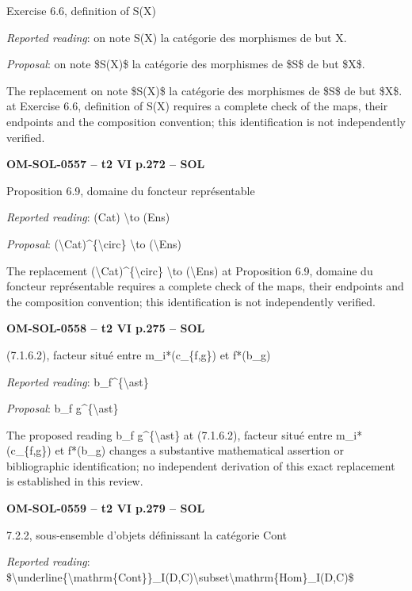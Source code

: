 Exercise 6.6, definition of S(X)\par
\emph{Reported reading}: on note S(X) la catégorie des morphismes de but X.\par
\emph{Proposal}: on note \$S(X)\$ la catégorie des morphismes de \$S\$ de but \$X\$.\par
The replacement on note \$S(X)\$ la catégorie des morphismes de \$S\$ de but \$X\$. at Exercise 6.6, definition of S(X) requires a complete check of the maps, their endpoints and the composition convention; this identification is not independently verified.\par
\par\noindent\textbf{OM-SOL-0557 -- t2 VI p.272 -- SOL}\par
Proposition 6.9, domaine du foncteur représentable\par
\emph{Reported reading}: (Cat) \textbackslash{}to (Ens)\par
\emph{Proposal}: (\textbackslash{}Cat)\textasciicircum{}\{\textbackslash{}circ\} \textbackslash{}to (\textbackslash{}Ens)\par
The replacement (\textbackslash{}Cat)\textasciicircum{}\{\textbackslash{}circ\} \textbackslash{}to (\textbackslash{}Ens) at Proposition 6.9, domaine du foncteur représentable requires a complete check of the maps, their endpoints and the composition convention; this identification is not independently verified.\par
\par\noindent\textbf{OM-SOL-0558 -- t2 VI p.275 -- SOL}\par
(7.1.6.2), facteur situé entre m\_i*(c\_\{f,g\}) et f*(b\_g)\par
\emph{Reported reading}: b\_f\textasciicircum{}\{\textbackslash{}ast\}\par
\emph{Proposal}: b\_f g\textasciicircum{}\{\textbackslash{}ast\}\par
The proposed reading b\_f g\textasciicircum{}\{\textbackslash{}ast\} at (7.1.6.2), facteur situé entre m\_i*(c\_\{f,g\}) et f*(b\_g) changes a substantive mathematical assertion or bibliographic identification; no independent derivation of this exact replacement is established in this review.\par
\par\noindent\textbf{OM-SOL-0559 -- t2 VI p.279 -- SOL}\par
7.2.2, sous-ensemble d'objets définissant la catégorie Cont\par
\emph{Reported reading}: \$\textbackslash{}underline\{\textbackslash{}mathrm\{Cont\}\}\_I(D,C)\textbackslash{}subset\textbackslash{}mathrm\{Hom\}\_I(D,C)\$\par
